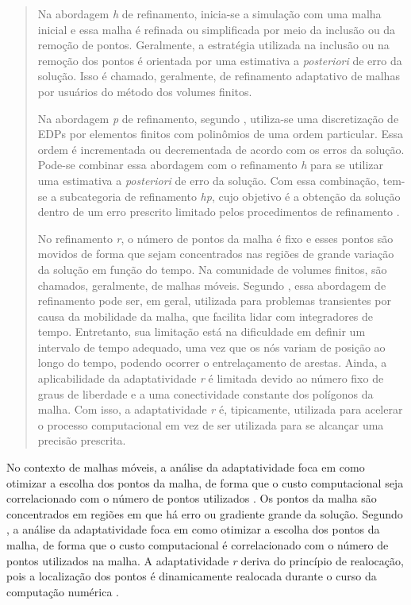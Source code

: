 \begin{quotation}
Na abordagem {\it h}  de refinamento, inicia-se a simulação com uma malha inicial e essa malha é refinada ou simplificada por meio da inclusão ou da remoção de pontos. Geralmente, a estratégia utilizada na inclusão ou na remoção dos pontos é orientada por uma estimativa a {\it posteriori} de erro da solução. Isso é chamado, geralmente, de refinamento adaptativo de malhas por usuários do método dos volumes finitos.  

Na abordagem {\it p} de refinamento, segundo , utiliza-se uma discretização de EDPs por elementos finitos com polinômios de uma ordem particular. Essa ordem é incrementada ou decrementada de acordo com os erros da solução. Pode-se combinar essa abordagem com o refinamento {\it h} para se utilizar uma estimativa a {\it posteriori} de erro da solução. Com essa combinação, tem-se a subcategoria de refinamento {\it hp}, cujo objetivo é a obtenção da solução dentro de um erro prescrito limitado pelos procedimentos de refinamento .

No refinamento {\it r}, o número de pontos da malha é fixo e esses pontos são movidos de forma que sejam concentrados nas regiões de grande variação da solução em função do tempo. Na comunidade de volumes finitos, são chamados, geralmente, de malhas móveis.  Segundo , essa abordagem de refinamento pode ser, em geral, utilizada para  problemas transientes por causa da mobilidade da malha, que  facilita lidar com integradores de tempo. Entretanto, sua limitação está na dificuldade em definir um intervalo de tempo adequado, uma vez que os nós variam de posição ao longo do tempo, podendo ocorrer o entrelaçamento de arestas. Ainda, a aplicabilidade da adaptatividade {\it r} é limitada devido ao número fixo de graus de liberdade e a uma conectividade constante dos  polígonos da malha. Com isso, a adaptatividade {\it r} é, tipicamente, utilizada para acelerar o processo computacional em vez de ser utilizada para se alcançar uma precisão prescrita. 
\end{quotation}

No contexto de malhas móveis, a análise da adaptatividade foca em como otimizar a escolha dos pontos da malha, de forma que o custo computacional seja correlacionado com o número de pontos utilizados \cite{Huang2011}. Os pontos da malha são concentrados em regiões em que há erro ou gradiente grande da solução. Segundo , a análise da adaptatividade foca em como otimizar a escolha dos pontos da malha, de forma que o custo computacional é correlacionado com o número de pontos utilizados na malha. A adaptatividade {\it r} deriva do princípio de realocação, pois a localização dos pontos é dinamicamente realocada durante o curso da computação numérica \cite{Huang2011}.


